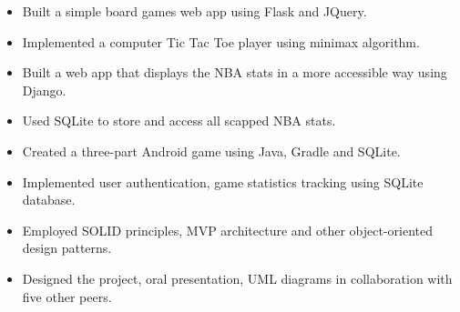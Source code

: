 


\vspace{5pt}

\begin{itemize}
	\item Built a simple board games web app using Flask and JQuery.
	\item Implemented a computer Tic Tac Toe player using minimax algorithm.
\end{itemize}

\divider


\vspace{5pt}

\begin{itemize}
	\item Built a web app that displays the NBA stats in a more accessible way using Django.
    \item Used SQLite to store and access all scapped NBA stats.
\end{itemize}

\divider


\vspace{5pt}

\begin{itemize}
	\item Created a three-part Android game using Java, Gradle and SQLite.
    \item Implemented user authentication, game statistics tracking using SQLite database.
    \item Employed SOLID principles, MVP architecture and other object-oriented design patterns.
	\item Designed the project, oral presentation, UML diagrams in collaboration with five other peers.
\end{itemize}

\divider


